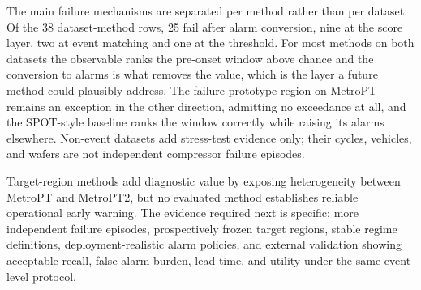 The main failure mechanisms are separated per method rather than per dataset. Of the 38 dataset-method rows, 25 fail after alarm conversion, nine at the score layer, two at event matching and one at the threshold. For most methods on both datasets the observable ranks the pre-onset window above chance and the conversion to alarms is what removes the value, which is the layer a future method could plausibly address. The failure-prototype region on MetroPT remains an exception in the other direction, admitting no exceedance at all, and the SPOT-style baseline ranks the window correctly while raising its alarms elsewhere. Non-event datasets add stress-test evidence only; their cycles, vehicles, and wafers are not independent compressor failure episodes.

Target-region methods add diagnostic value by exposing heterogeneity between MetroPT and MetroPT2, but no evaluated method establishes reliable operational early warning. The evidence required next is specific: more independent failure episodes, prospectively frozen target regions, stable regime definitions, deployment-realistic alarm policies, and external validation showing acceptable recall, false-alarm burden, lead time, and utility under the same event-level protocol.
